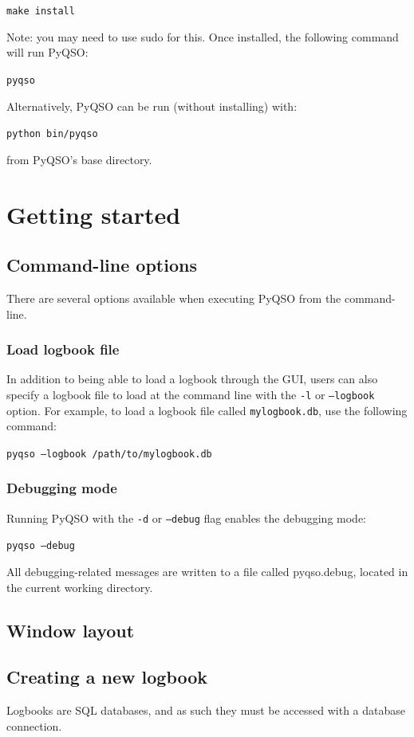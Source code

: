 \documentclass[11pt, a4paper]{report}
\begin{document}
  \texttt{make install}

\noindent Note: you may need to use sudo for this. Once installed, the following command will run PyQSO:

  \texttt{pyqso}

\noindent Alternatively, PyQSO can be run (without installing) with:

  \texttt{python bin/pyqso}

\noindent from PyQSO's base directory.



\chapter{Getting started}

\section{Command-line options}
There are several options available when executing PyQSO from the command-line.

\subsection{Load logbook file}
In addition to being able to load a logbook through the GUI, users can also specify a logbook file to load at the command line with the \texttt{-l} or \texttt{--logbook} option. For example, to load a logbook file called \texttt{mylogbook.db}, use the following command:

  \texttt{pyqso --logbook /path/to/mylogbook.db}

\subsection{Debugging mode}
Running PyQSO with the \texttt{-d} or \texttt{--debug} flag enables the debugging mode:

  \texttt{pyqso --debug}

\noindent All debugging-related messages are written to a file called pyqso.debug, located in the current working directory.

\section{Window layout}



\section{Creating a new logbook}
Logbooks are SQL databases, and as such they must be accessed with a database connection.
\end{document}
